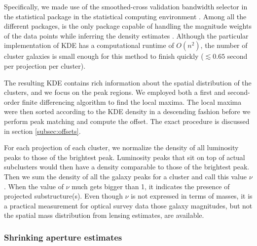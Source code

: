 Specifically, we made use of the smoothed-cross validation \citep{Hall1992} 
bandwidth selector in the statistical package {} \citep{Duong2007} 
in the {} statistical computing environment \citep{R_core}. 
Among all the different {} packages, {} is the
only package capable of handling the magnitude weights of the data points 
while inferring the density estimates \citep{Deng2011}. 
Although the particular implementation of KDE has a computational runtime of $O(n^2)$, 
the number of cluster galaxies is
small enough for this method to finish quickly ($\lesssim 0.65$ second per
projection per cluster). 

The resulting KDE contains rich information about the spatial distribution of
the clusters, and we focus on the peak regions.  
We employed both a first and second-order  
finite differencing algorithm to find the local maxima.  
The local maxima were then sorted according to the KDE density in a descending
fashion before we perform peak matching and compute the offset. The exact
procedure is discussed in section \ref{subsec:offsets}. 

For each projection of each cluster, we normalize the density of all 
luminosity peaks to those of the brightest peak. 
Luminosity peaks that sit on top of actual subclusters would then have a density 
comparable to those of the brightest peak. 
Then we sum the density of all the galaxy peaks for a cluster and call this value
$\nu$. When the value of $\nu$ much gets bigger than 1, it indicates the presence 
of projected substructure(s). Even though 
$\nu$ is not expressed in terms of masses, it is a practical measurement
for optical survey data those galaxy magnitudes, but not the spatial mass distribution 
from lensing estimates, are available. 

\subsubsection{Shrinking aperture estimates}

